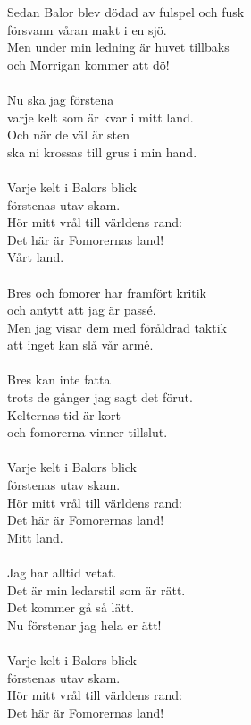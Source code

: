 \documentclass[a6paper, 10pt, twoside]{article}
\begin{document}
\begin{center}
\end{center}
\begin{lyrics}
Sedan Balor blev dödad av fulspel och fusk \\
försvann våran makt i en sjö. \\
Men under min ledning är huvet tillbaks \\
och Morrigan kommer att dö! \\
\\
Nu ska jag förstena \\
varje kelt som är kvar i mitt land. \\
Och när de väl är sten \\
ska ni krossas till grus i min hand. \\
\\
Varje kelt i Balors blick \\
förstenas utav skam.\\
Hör mitt vrål till världens rand: \\
Det här är Fomorernas land! \\
Vårt land.\\
\\
Bres och fomorer har framfört kritik\\
och antytt att jag är passé.\\
Men jag visar dem med föråldrad taktik\\
att inget kan slå vår armé.\\
\\
Bres kan inte fatta \\
trots de gånger jag sagt det förut. \\
Kelternas tid är kort \\
och fomorerna vinner tillslut. \\
\\
Varje kelt i Balors blick \\
förstenas utav skam. \\
Hör mitt vrål till världens rand: \\
Det här är Fomorernas land! \\
Mitt land. \\
\\
Jag har alltid vetat. \\
Det är min ledarstil som är rätt. \\
Det kommer gå så lätt. \\
Nu förstenar jag hela er ätt! \\
\\
Varje kelt i Balors blick\\
förstenas utav skam. \\
Hör mitt vrål till världens rand: \\
Det här är Fomorernas land!

\end{lyrics}
\end{document}
